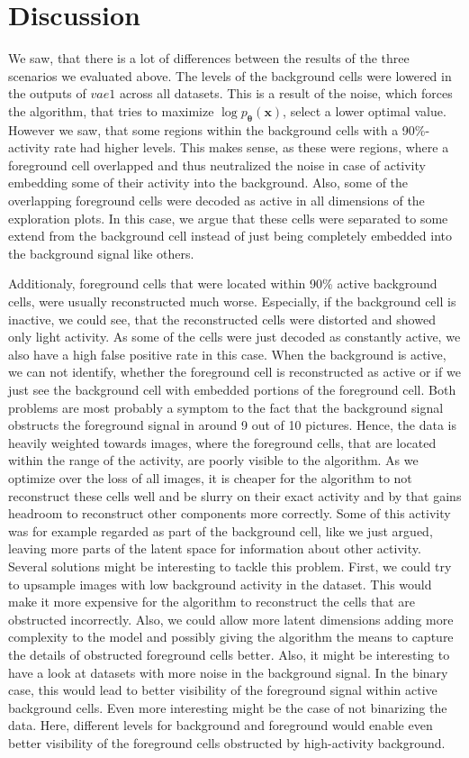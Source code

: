 \documentclass[12pt]{report}
\theoremstyle{definition}
\begin{document}
\section{Discussion}
We saw, that there is a lot of differences between the results of the three scenarios we evaluated above.
The levels of the background cells were lowered in the outputs of $vae1$ across all datasets. This is a result of the noise, which forces the algorithm, that tries to maximize $\log p_{\pmb{\theta}}(\mathbf{x})$, select a lower optimal value. However we saw, that some regions within the background cells with a 90\%-activity rate had higher levels. This makes sense, as these were regions, where a foreground cell overlapped and thus neutralized the noise in case of activity embedding some of their activity into the background. Also, some of the overlapping foreground cells were decoded as active in all dimensions of the exploration plots. In this case, we argue that these cells were separated to some extend from the background cell instead of just being completely embedded into the background signal like others.

Additionaly, foreground cells that were located within 90\% active background cells, were usually reconstructed much worse. Especially, if the background cell is inactive, we could see, that the reconstructed cells were distorted and showed only light activity. As some of the cells were just decoded as constantly active, we also have a high false positive rate in this case. When the background is active, we can not identify, whether the foreground cell is reconstructed as active or if we just see the background cell with embedded portions of the foreground cell.
Both problems are most probably a symptom to the fact that the background signal obstructs the foreground signal in around 9 out of 10 pictures. Hence, the data is heavily weighted towards images, where the foreground cells, that are located within the range of the activity, are poorly visible to the algorithm. As we optimize over the loss of all images, it is cheaper for the algorithm to not reconstruct these cells well and be slurry on their exact activity and by that gains headroom to reconstruct other components more correctly. Some of this activity was for example regarded as part of the background cell, like we just argued, leaving more parts of the latent space for information about other activity. Several solutions might be interesting to tackle this problem. First, we could try to upsample images with low background activity in the dataset. This would make it more expensive for the algorithm to reconstruct the cells that are obstructed incorrectly. Also, we could allow more latent dimensions adding more complexity to the model and possibly giving the algorithm the means to capture the details of obstructed foreground cells better. Also, it might be interesting to have a look at datasets with more noise in the background signal. In the binary case, this would lead to better visibility of the foreground signal within active background cells. Even more interesting might be the case of not binarizing the data. Here, different levels for background and foreground would enable even better visibility of the foreground cells obstructed by high-activity background.
\end{document}
